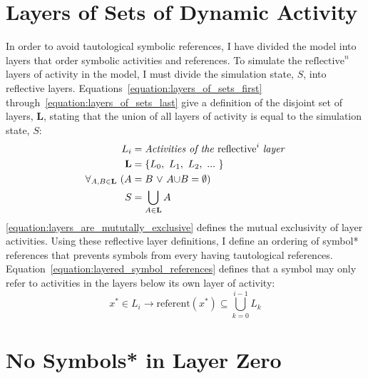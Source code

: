 \section{Layers of Sets of Dynamic Activity}

In order to avoid tautological symbolic references, I have divided the
model into layers that order symbolic activities and references.  To
simulate the $\text{reflective}^n$ layers of activity in the model, I
must divide the simulation state, $S$, into reflective layers.
Equations~\ref{equation:layers_of_sets_first}
through~\ref{equation:layers_of_sets_last} give a definition of the
disjoint set of layers, $\mathbf{L}$, stating that the union of all
layers of activity is equal to the simulation state, $S$:
\begin{align}
\label{equation:layers_of_sets_first}
                            L_i &= \text{\emph{Activities of the} }\text{reflective}^i\text{ \emph{layer}} \\
                     \mathbf{L} &= \{L_0, ~L_1, ~L_2, ~...~ \} \\
\label{equation:layers_are_mututally_exclusive}
\forall_{A,B{\in}{\mathbf{L}}} ~ (A &= B ~{\vee}~ A{\cup}B = {\emptyset}) \\
\label{equation:layers_of_sets_last}
                      S &= \bigcup_{A{\in}\mathbf{L}}{A}
\end{align}
{\mbox{\autoref{equation:layers_are_mututally_exclusive}}} defines the
mutual exclusivity of layer activities.  Using these reflective layer
definitions, I define an ordering of symbol* references that prevents
symbols from every having tautological references.
Equation~\ref{equation:layered_symbol_references} defines that a
symbol may only refer to activities in the layers below its own layer
of activity:
\begin{equation}
\label{equation:layered_symbol_references}
x^* \in L_i \rightarrow \text{referent}(x^*) \subseteq \bigcup_{k=0}^{i-1}{L_k}
\end{equation}

\section{No Symbols* in Layer Zero}

